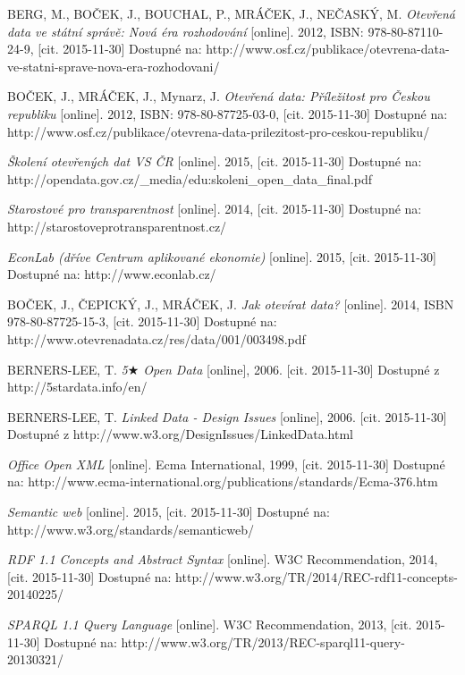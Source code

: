 \begin{thebibliography}{99}
  BERG, M., BOČEK, J., BOUCHAL, P., MRÁČEK, J., NEČASKÝ, M.
  \emph{Otevřená data ve státní správě: Nová éra rozhodování} 
  [online]. 2012, ISBN: 978-80-87110-24-9, [cit. 2015-11-30] Dostupné na: 
  http://www.osf.cz/publikace/otevrena-data-ve-statni-sprave-nova-era-rozhodovani/
  
  BOČEK, J., MRÁČEK, J., Mynarz, J.
  \emph{Otevřená data: Příležitost pro Českou republiku} 
  [online]. 2012, ISBN: 978-80-87725-03-0, [cit. 2015-11-30] Dostupné na: 
  http://www.osf.cz/publikace/otevrena-data-prilezitost-pro-ceskou-republiku/
  
  \emph{Školení otevřených dat VS ČR} 
  [online]. 2015, [cit. 2015-11-30] Dostupné na: 
  http://opendata.gov.cz/\_media/edu:skoleni\_open\_data\_final.pdf

  \emph{Starostové pro transparentnost} 
  [online]. 2014, [cit. 2015-11-30] Dostupné na: 
  http://starostoveprotransparentnost.cz/ 

  \emph{EconLab (dříve Centrum aplikované ekonomie)} 
  [online]. 2015, [cit. 2015-11-30] Dostupné na: 
  http://www.econlab.cz/
  
  BOČEK, J., ČEPICKÝ, J., MRÁČEK, J.
  \emph{Jak otevírat data?} 
  [online]. 2014, ISBN 978-80-87725-15-3, [cit. 2015-11-30] Dostupné na: 
  http://www.otevrenadata.cz/res/data/001/003498.pdf
  
  BERNERS-LEE, T.
  \emph{5$\bigstar$ Open Data}
  [online], 2006. [cit. 2015-11-30] Dostupné z 
  http://5stardata.info/en/  
  
  BERNERS-LEE, T.
  \emph{Linked Data - Design Issues}
  [online], 2006. [cit. 2015-11-30] Dostupné z 
  http://www.w3.org/DesignIssues/LinkedData.html
  
  \emph{Office Open XML} 
  [online]. Ecma International, 1999, [cit. 2015-11-30] Dostupné na: 
  http://www.ecma-international.org/publications/standards/Ecma-376.htm
  
  \emph{Semantic web} 
  [online]. 2015, [cit. 2015-11-30] Dostupné na: 
  http://www.w3.org/standards/semanticweb/ 

  \emph{RDF 1.1 Concepts and Abstract Syntax} 
  [online]. W3C Recommendation, 2014, [cit. 2015-11-30] Dostupné na: 
  http://www.w3.org/TR/2014/REC-rdf11-concepts-20140225/  
  
  \emph{SPARQL 1.1 Query Language} 
  [online]. W3C Recommendation, 2013, [cit. 2015-11-30] Dostupné na: 
  http://www.w3.org/TR/2013/REC-sparql11-query-20130321/ 
  

\end{thebibliography}
